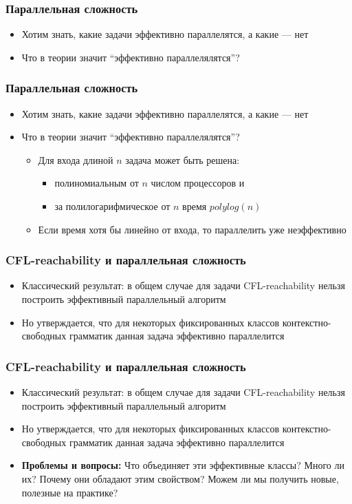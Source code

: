 \documentclass{beamer}
\begin{document}
\begin{frame}
\frametitle{Параллельная сложность}
\begin{itemize}
\item Хотим знать, какие задачи эффективно параллелятся, а какие --- нет
\item Что в теории значит ``эффективно параллелялятся''?
\end{itemize}
\end{frame}
\begin{frame}
\frametitle{Параллельная сложность}
\begin{itemize}
\item Хотим знать, какие задачи эффективно параллелятся, а какие --- нет
\item Что в теории значит ``эффективно параллелялятся''?
\begin{itemize}
\item Для входа длиной $n$ задача может быть решена:
\begin{itemize}
\item полиномиальным от $n$ числом процессоров и 
\item за полилогарифмическое от $n$ время $polylog(n)$
\end{itemize}
\item Если время хотя бы линейно от входа, то параллелить уже неэффективно
\end{itemize}
\end{itemize}
\end{frame}

\begin{frame}
\frametitle{CFL-reachability и параллельная сложность}
\begin{itemize}
\item Классический результат: в общем случае для задачи CFL-reachability нельзя построить эффективный параллельный алгоритм
\item Но утверждается, что для некоторых фиксированных классов контекстно-свободных грамматик данная задача эффективно параллелится
\end{itemize}
\end{frame}


\begin{frame}
\frametitle{CFL-reachability и параллельная сложность}
\begin{itemize}
\item Классический результат: в общем случае для задачи CFL-reachability нельзя построить эффективный параллельный алгоритм
\item Но утверждается, что для некоторых фиксированных классов контекстно-свободных грамматик данная задача эффективно параллелится
\item \textbf{Проблемы и вопросы:} Что объединяет эти эффективные классы? Много ли их? Почему они обладают этим свойством? Можем ли мы получить новые, полезные на практике?
\end{itemize}
\end{frame}
\end{document}

